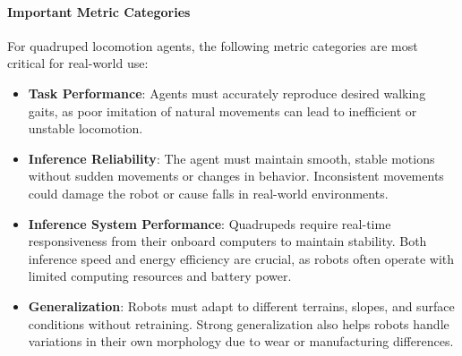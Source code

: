 
\paragraph{Important Metric Categories}
For quadruped locomotion agents, the following metric categories are most critical for real-world use:

\begin{itemize}
    \item \textbf{Task Performance}: Agents must accurately reproduce desired walking gaits, as poor imitation of natural movements can lead to inefficient or unstable locomotion.
    
    \item \textbf{Inference Reliability}: The agent must maintain smooth, stable motions without sudden movements or changes in behavior. Inconsistent movements could damage the robot or cause falls in real-world environments.
    
    \item \textbf{Inference System Performance}: Quadrupeds require real-time responsiveness from their onboard computers to maintain stability. Both inference speed and energy efficiency are crucial, as robots often operate with limited computing resources and battery power.
    
    \item \textbf{Generalization}: Robots must adapt to different terrains, slopes, and surface conditions without retraining. Strong generalization also helps robots handle variations in their own morphology due to wear or manufacturing differences.
\end{itemize}